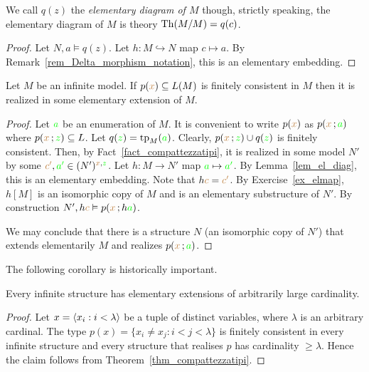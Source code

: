  We call $q(z)$ the \emph{elementary diagram of $M$} though, strictly speaking, the elementary diagram of $M$ is theory ${\rm Th}(M/M)=q(c)$.

\vspace*{-\parskip}
\begin{proof}
    Let $N,a\models q(z)$.
    Let $h:M\hookrightarrow N$ map $c\mapsto a$.
    By Remark~\ref{rem_Delta_morphism_notation}, this is an elementary embedding.
\end{proof}

\begin{void}\label{thm_compattezzatipi}
    Let $M$ be an infinite model.
    If $p({\color{brown} x})\subseteq L(M)$ is finitely consistent in $M$ then it is realized in some elementary extension of $M$.
\end{void}

\begin{proof}
  Let ${\color{green} a}$ be an enumeration of $M$.
  It is convenient to write $p({\color{brown} x})$ as $p({\color{brown} x}\,;{\color{green} a})$ where $p({\color{brown} x}\,;{\color{green} z})\subseteq L$.
  Let $q({\color{green} z})={\rm tp}_M({\color{green} a})$.
  Clearly, $p({\color{brown} x}\,;{\color{green} z})\cup q({\color{green} z})$ is finitely consistent.
  Then, by Fact~\ref{fact_compattezzatipi}, it is realized in some model $N'$ by some ${\color{brown} c'},{\color{green} a'}\in (N')^{{\color{brown} x},{\color{green} z}}$.                                                      
  Let $h:M\to N'$ map ${\color{green} a}\mapsto {\color{green}a'}$.
  By Lemma~\ref{lem_el_diag}, this is an elementary embedding.
  Note that $h{\color{brown} c}={\color{brown} c'}$.
  By Exercise~\ref{ex_elmap}, $h[M]$ is an isomorphic copy of $M$ and is an elementary substructure of $N'$.
  By construction $N',h{\color{brown} c}\vDash p({\color{brown} x}\,;h{\color{green} a})$.

  We may conclude that there is a structure $N$ (an isomorphic copy of $N'$) that extends elementarily $M$ and realizes $p({\color{brown} x}\,;{\color{green} a})$.
\end{proof}

The following corollary is historically important.

\begin{void}
Every infinite structure has elementary extensions of arbitrarily large cardinality.
\end{void}

\begin{proof}
Let $x=\langle x_i:i<\lambda\rangle$ be a tuple of distinct variables, where $\lambda$ is an arbitrary cardinal.
The type $p(x)=\big\{x_i\neq x_j: i<j<\lambda\big\}$ is finitely consistent in every infinite structure and every structure that realises $p$ has cardinality $\ge\lambda$.
Hence the claim follows from Theorem~\ref{thm_compattezzatipi}.
\end{proof}

